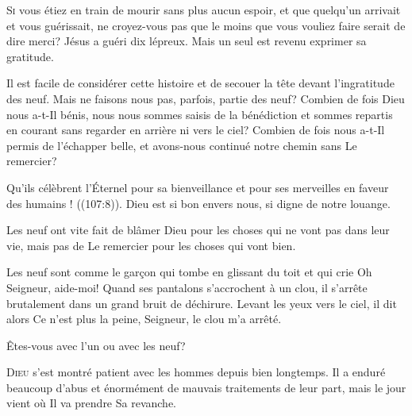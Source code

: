 \lettrine{S}{i} vous étiez en train de mourir sans plus aucun espoir,
 et que quelqu'un arrivait et vous guérissait, ne croyez-vous pas
 que le moins que vous vouliez faire serait de dire merci?
 Jésus a guéri dix lépreux. Mais un seul est revenu exprimer sa gratitude.

Il est facile de considérer cette histoire et de secouer la tête
 devant l'ingratitude des neuf. Mais ne faisons nous pas, parfois,
 partie des neuf? Combien de fois Dieu nous a-t-Il bénis,
 nous nous sommes saisis de la bénédiction et sommes
 repartis en courant sans regarder en arrière ni vers le ciel?
 Combien de fois nous a-t-Il permis de l'échapper belle,
 et avons-nous continué notre chemin sans Le remercier?


\Og Qu'ils célèbrent l'Éternel pour sa bienveillance
 et pour ses merveilles en faveur des humains ! \Fg{}
 ((107:8)).
 Dieu est si bon envers nous, si digne de notre louange.

Les neuf ont vite fait de blâmer Dieu pour les choses qui ne vont pas
 dans leur vie, mais pas de Le remercier pour les choses qui vont bien.

Les neuf sont comme le gar\c{c}on qui tombe en glissant du toit
 et qui crie\frcolon{} 
 \Og Oh Seigneur, aide-moi! \Fg{} Quand ses pantalons s'accrochent à un clou,
 il s'arrête brutalement dans un grand bruit de déchirure.
 Levant les yeux vers le ciel, il dit alors\frcolon{} 
 \Og Ce n'est plus la peine, Seigneur, le clou m'a arrêté. \Fg{}

Êtes-vous avec l'un ou avec les neuf?

\dvrule






\lettrine{D}{ieu} s'est montré patient avec les hommes
 depuis bien longtemps.
 Il a enduré beaucoup d'abus et énormément
 de mauvais traitements de leur part,
 mais le jour vient où Il va prendre Sa revanche.

